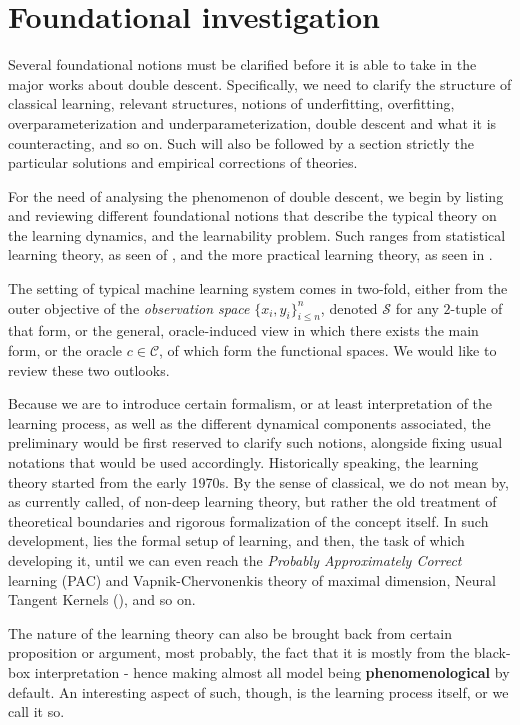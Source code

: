 \section{Foundational investigation}

Several foundational notions must be clarified before it is able to take in the major works about double descent. Specifically, we need to clarify the structure of classical learning, relevant structures, notions of underfitting, overfitting, overparameterization and underparameterization, double descent and what it is counteracting, and so on. Such will also be followed by a section strictly the particular solutions and empirical corrections of theories. 

For the need of analysing the phenomenon of double descent, we begin by listing and reviewing different foundational notions that describe the typical theory on the learning dynamics, and the learnability problem. Such ranges from statistical learning theory, as seen of \cite{Vapnik1999-VAPTNO,STL_Hajek_Maxim_2021,10.5555/2371238}, and the more practical learning theory, as seen in \cite{James2021}. 

The setting of typical machine learning system comes in two-fold, either from the outer objective of the \textit{observation space} $\{x_{i},y_{i}\}_{i\leq n}^{n}$, denoted $\mathcal{S}$ for any $2$-tuple of that form, or the general, oracle-induced view in which there exists the main form, or the oracle $c\in\mathcal{C}$, of which form the functional spaces. We would like to review these two outlooks.

Because we are to introduce certain formalism, or at least interpretation of the learning process, as well as the different dynamical components associated, the preliminary would be first reserved to clarify such notions, alongside fixing usual notations that would be used accordingly. Historically speaking, the learning theory started from the early 1970s. By the sense of classical, we do not mean by, as currently called, of non-deep learning theory, but rather the old treatment of theoretical boundaries and rigorous formalization of the concept itself. In such development, lies the formal setup of learning, and then, the task of which developing it, until we can even reach the \textit{Probably Approximately Correct} learning (PAC) and Vapnik-Chervonenkis theory of maximal dimension, Neural Tangent Kernels (\cite{Jacot:2018:NTK}), and so on.  

The nature of the learning theory can also be brought back from certain proposition or argument, most probably, the fact that it is mostly from the black-box interpretation - hence making almost all model being \textbf{phenomenological} by default. An interesting aspect of such, though, is the learning process itself, or we call it so.


